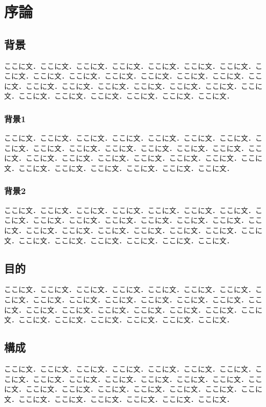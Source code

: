 \chapter{序論}
\section{背景}
ここに文．ここに文．ここに文．ここに文．ここに文．ここに文．ここに文．ここに文．ここに文．ここに文．ここに文．ここに文．ここに文．ここに文．ここに文．ここに文．ここに文．ここに文．ここに文．ここに文．ここに文．ここに文．ここに文．ここに文．ここに文．ここに文．ここに文．ここに文．
\subsection{背景1}

ここに文．ここに文．ここに文．ここに文．ここに文．ここに文．ここに文．ここに文．ここに文．ここに文．ここに文．ここに文．ここに文．ここに文．ここに文．ここに文．ここに文．ここに文．ここに文．ここに文．ここに文．ここに文．ここに文．ここに文．ここに文．ここに文．ここに文．ここに文．
\subsection{背景2}
ここに文．ここに文．ここに文．ここに文．ここに文．ここに文．ここに文．ここに文．ここに文．ここに文．ここに文．ここに文．ここに文．ここに文．ここに文．ここに文．ここに文．ここに文．ここに文．ここに文．ここに文．ここに文．ここに文．ここに文．ここに文．ここに文．ここに文．ここに文．
\section{目的}
ここに文．ここに文．ここに文．ここに文．ここに文．ここに文．ここに文．ここに文．ここに文．ここに文．ここに文．ここに文．ここに文．ここに文．ここに文．ここに文．ここに文．ここに文．ここに文．ここに文．ここに文．ここに文．ここに文．ここに文．ここに文．ここに文．ここに文．ここに文．
\section{構成}
ここに文．ここに文．ここに文．ここに文．ここに文．ここに文．ここに文．ここに文．ここに文．ここに文．ここに文．ここに文．ここに文．ここに文．ここに文．ここに文．ここに文．ここに文．ここに文．ここに文．ここに文．ここに文．ここに文．ここに文．ここに文．ここに文．ここに文．ここに文．
